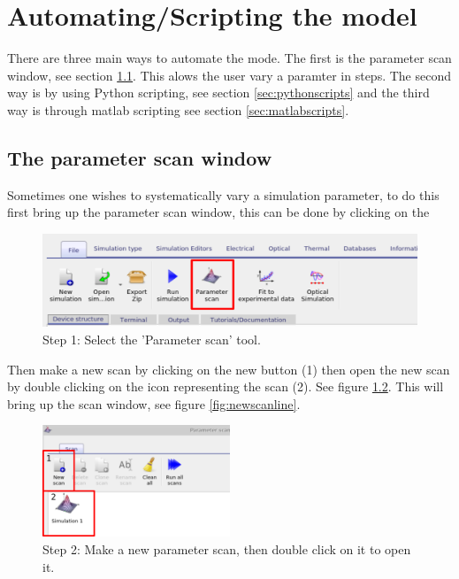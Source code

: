 \newpage
\chapter{Automating/Scripting the model}
There are three main ways to automate the mode. The first is the parameter scan window, see section \ref{sec:scanwindow}.  This alows the user vary a paramter in steps. The second way is by using Python scripting, see section \ref{sec:pythonscripts} and the third way is through matlab scripting see section \ref{sec:matlabscripts}. 

\section{The parameter scan window}
\label{sec:scanwindow}

Sometimes one wishes to systematically vary a simulation parameter, to do this first bring up the parameter scan window, this can be done by clicking on the 




\begin{figure}[H]
\centering
\includegraphics[width=\textwidth]{./images/param_scan.png}
{\caption{Step 1: Select the 'Parameter scan' tool.}}
\label{overflow}
\end{figure}

Then make a new scan by clicking on the new button (1) then open the new scan by double clicking on the icon representing the scan (2). See figure \ref{fig:newscan}. This will bring up the scan window, see figure \ref{fig:newscanline}.

\begin{figure}[H]
\centering
\includegraphics[width=0.5\textwidth]{./images/param_scan_new.png}
\caption{Step 2: Make a new parameter scan, then double click on it to open it.}
\label{fig:newscan}
\end{figure}

